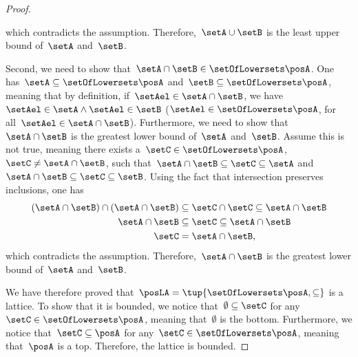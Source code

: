\begin{proof}
\begin{compactitem}
\begin{equation}
              \end{equation}
              which contradicts the assumption.
              Therefore,~$\setA\cup \setB$ is the least upper bound of~$\setA$ and~$\setB$.
        \item Second, we need to show that~$\setA\cap \setB\in \setOfLowersets \posA$.
              One has~$\setA\subseteq \setOfLowersets \posA$ and~$\setB\subseteq \setOfLowersets \posA$, meaning that by definition, if~$\setAel\in \setA\cap \setB$, we have~$\setAel \in \setA\wedge \setAel\in \setB$ ($\setAel\in \setOfLowersets \posA$, for all~$\setAel\in \setA\cap \setB$).
              Furthermore, we need to show that~$\setA\cap \setB$ is the greatest lower bound of~$\setA$ and~$\setB$.
              Assume this is not true, meaning there exists a~$\setC\in \setOfLowersets \posA$,~$\setC\neq \setA\cap \setB$, such that~$\setA\cap \setB\subseteq \setC\subseteq \setA$ and~$\setA\cap \setB\subseteq \setC\subseteq \setB$.
              Using the fact that intersection preserves inclusions, one has
              \begin{equation}
                  \begin{aligned}
                      (\setA\cap \setB)
                      \cap (\setA\cap \setB) & \subseteq \setC \cap \setC \subseteq \setA\cap \setB \\
                      \setA\cap \setB        & \subseteq \setC\subseteq \setA\cap \setB             \\
                      \setC                  & =\setA\cap \setB,
                  \end{aligned}
              \end{equation}
              which contradicts the assumption.
              Therefore,~$\setA\cap \setB$ is the greatest lower bound of~$\setA$ and~$\setB$.
    \end{compactitem}
    We have therefore proved that~$\posLA=\tup{\setOfLowersets \posA,\subseteq}$ is a lattice.
    To show that it is bounded, we notice that~$\emptyset \subseteq \setC$ for any~$\setC\in \setOfLowersets \posA$, meaning that~$\emptyset$ is the bottom.
    Furthermore, we notice that~$\setC\subseteq \posA$ for any~$\setC\in \setOfLowersets \posA$, meaning that~$\posA$ is a top.
    Therefore, the lattice is bounded.
\end{proof}
